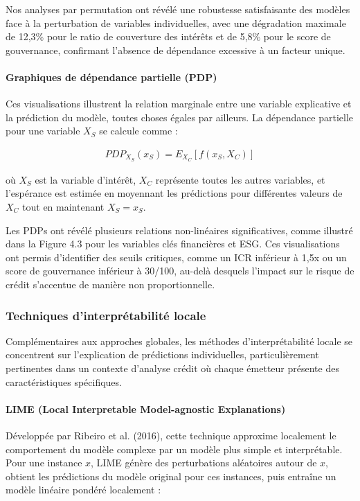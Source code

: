 Nos analyses par permutation ont révélé une robustesse satisfaisante des modèles face à la perturbation de variables individuelles, avec une dégradation maximale de 12,3\% pour le ratio de couverture des intérêts et de 5,8\% pour le score de gouvernance, confirmant l'absence de dépendance excessive à un facteur unique.

\paragraph{Graphiques de dépendance partielle (PDP)} 

Ces visualisations illustrent la relation marginale entre une variable explicative et la prédiction du modèle, toutes choses égales par ailleurs. La dépendance partielle pour une variable $X_S$ se calcule comme :

\begin{align}
PDP_{X_S}(x_S) = E_{X_C}[f(x_S, X_C)]
\end{align}

où $X_S$ est la variable d'intérêt, $X_C$ représente toutes les autres variables, et l'espérance est estimée en moyennant les prédictions pour différentes valeurs de $X_C$ tout en maintenant $X_S = x_S$.

Les PDPs ont révélé plusieurs relations non-linéaires significatives, comme illustré dans la Figure 4.3 pour les variables clés financières et ESG. Ces visualisations ont permis d'identifier des seuils critiques, comme un ICR inférieur à 1,5x ou un score de gouvernance inférieur à 30/100, au-delà desquels l'impact sur le risque de crédit s'accentue de manière non proportionnelle.

\subsubsection{Techniques d'interprétabilité locale}

Complémentaires aux approches globales, les méthodes d'interprétabilité locale se concentrent sur l'explication de prédictions individuelles, particulièrement pertinentes dans un contexte d'analyse crédit où chaque émetteur présente des caractéristiques spécifiques.

\paragraph{LIME (Local Interpretable Model-agnostic Explanations)} 

Développée par Ribeiro et al. (2016), cette technique approxime localement le comportement du modèle complexe par un modèle plus simple et interprétable. Pour une instance $x$, LIME génère des perturbations aléatoires autour de $x$, obtient les prédictions du modèle original pour ces instances, puis entraîne un modèle linéaire pondéré localement :

